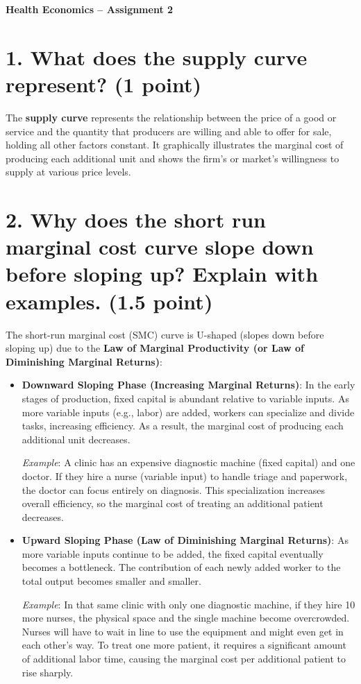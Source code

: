 \documentclass[11pt, letterpaper]{article}
\begin{document}
\begin{center}
    \LARGE\bfseries Health Economics -- Assignment 2
\end{center}
\vspace{1em}

\section*{1. What does the supply curve represent? (1 point)}

The \textbf{supply curve} represents the relationship between the price of a good or service and the quantity that producers are willing and able to offer for sale, holding all other factors constant. It graphically illustrates the marginal cost of producing each additional unit and shows the firm's or market's willingness to supply at various price levels.

\section*{2. Why does the short run marginal cost curve slope down before sloping up? Explain with examples. (1.5 point)}

The short-run marginal cost (SMC) curve is U-shaped (slopes down before sloping up) due to the \textbf{Law of Marginal Productivity (or Law of Diminishing Marginal Returns)}:

\begin{itemize}[leftmargin=*]
    \item \textbf{Downward Sloping Phase (Increasing Marginal Returns)}: In the early stages of production, fixed capital is abundant relative to variable inputs. As more variable inputs (e.g., labor) are added, workers can specialize and divide tasks, increasing efficiency. As a result, the marginal cost of producing each additional unit decreases.
    
    \textit{Example}: A clinic has an expensive diagnostic machine (fixed capital) and one doctor. If they hire a nurse (variable input) to handle triage and paperwork, the doctor can focus entirely on diagnosis. This specialization increases overall efficiency, so the marginal cost of treating an additional patient decreases.

    \item \textbf{Upward Sloping Phase (Law of Diminishing Marginal Returns)}: As more variable inputs continue to be added, the fixed capital eventually becomes a bottleneck. The contribution of each newly added worker to the total output becomes smaller and smaller.
    
    \textit{Example}: In that same clinic with only one diagnostic machine, if they hire 10 more nurses, the physical space and the single machine become overcrowded. Nurses will have to wait in line to use the equipment and might even get in each other's way. To treat one more patient, it requires a significant amount of additional labor time, causing the marginal cost per additional patient to rise sharply.
\end{itemize}
\end{document}
